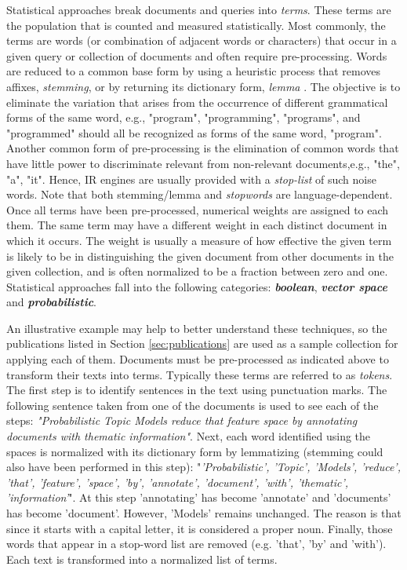 Statistical approaches break documents and queries into \textit{terms}. These terms are the population that is counted and measured statistically. Most commonly, the terms are words (or combination of adjacent words or characters) that occur in a given query or collection of documents and often require pre-processing. Words are reduced to a common base form by using a heuristic process that removes affixes, \textit{stemming}, or by returning its dictionary form, \textit{lemma} \citep{porter1997}. The objective is to eliminate the variation that arises from the occurrence of different grammatical  forms  of  the  same  word,  e.g.,  "program",  "programming",  "programs", and "programmed" should all be recognized as forms of the same word, "program". Another common form of pre-processing is the elimination of common words that have little power to discriminate relevant from non-relevant documents,e.g., "the", "a", "it". Hence, IR engines are usually provided with a \textit{stop-list} of such noise words. Note that both stemming/lemma and \textit{stopwords} are language-dependent. Once all terms have been pre-processed, numerical weights are assigned to each them. The same term may have a different weight in each distinct document in which it occurs. The weight is usually a measure of how effective the given term is likely to be in distinguishing the given document from other documents in the given collection, and is often normalized to be a fraction between zero and one. Statistical approaches fall into the following categories: \textbf{\textit{boolean}}, \textbf{\textit{vector space}} and \textbf{\textit{probabilistic}}.

An illustrative example may help to better understand these techniques, so the publications listed in Section \ref{sec:publications} are used as a sample collection for applying each of them. Documents must be pre-processed as indicated above to transform their texts into terms. Typically these terms are referred to as \textit{tokens}. The first step is to identify sentences in the text using punctuation marks. The following sentence taken from one of the documents is used to see each of the steps: \textit{"Probabilistic Topic Models reduce that feature space by annotating documents with thematic information"}. Next, each word identified using the spaces is normalized with its dictionary form by lemmatizing (stemming could also have been performed in this step): "\textit{'Probabilistic', 'Topic', 'Models', 'reduce', 'that', 'feature', 'space', 'by', 'annotate', 'document', 'with', 'thematic', 'information'}". At this step 'annotating' has become 'annotate' and 'documents' has become 'document'. However, 'Models' remains unchanged. The reason is that since it starts with a capital letter, it is considered a proper noun. Finally, those words that appear in a stop-word list are removed (e.g. 'that', 'by' and 'with'). Each text is transformed into a normalized list of terms.



